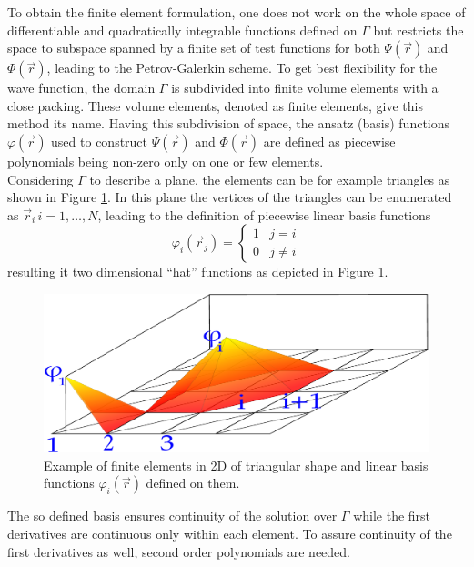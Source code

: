 To obtain the finite element formulation, one does not work on the whole space of differentiable and quadratically integrable functions defined on $\Gamma$ but restricts the space to subspace spanned by a finite set of test functions for both $\Psi(\vec{r})$ and $\Phi(\vec{r})$, leading to the Petrov-Galerkin scheme.
To get best flexibility for the wave function, the domain $\Gamma$ is subdivided into finite volume elements with a close packing.
These volume elements, denoted as finite elements, give this method its name.
Having this subdivision of space, the ansatz (basis) functions $\varphi(\vec{r})$ used to construct $\Psi(\vec{r})$ and $\Phi(\vec{r})$ are defined as piecewise polynomials being non-zero only on one or few elements.\\
Considering $\Gamma$ to describe a plane, the elements can be for example triangles as shown in Figure \ref{fig:2Del}.
In this plane the vertices of the triangles can be enumerated as $\vec{r}_i\, i=1,\hdots ,N $, leading to the definition of piecewise linear basis functions
\begin{equation}\label{eq:femAnsatz}
   \varphi_i(\vec{r}_j)=
           \begin{cases} 1  & j=i \\
                         0  & j\neq i \end{cases}
\end{equation}
resulting it two dimensional ``hat'' functions as depicted in Figure \ref{fig:2Del}.
\begin{figure}
   \includegraphics[width=.75\textwidth]{Figures/FEM2d-crop}
   \caption{Example of finite elements in 2D of triangular shape and linear basis functions $\varphi_i(\vec{r})$ defined on them.}
   \label{fig:2Del}
\end{figure}
The so defined basis ensures continuity of the solution over $\Gamma$ while the first derivatives are continuous only within each element.
To assure continuity of the first derivatives as well, second order polynomials are needed.

